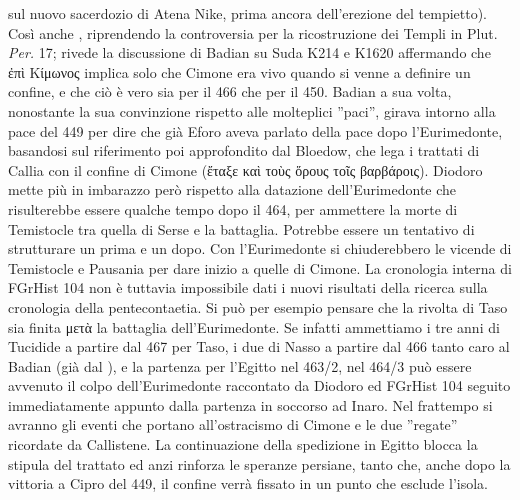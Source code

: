 {            %
\label{ref:dateeurimedonteepacedicallia} sul nuovo sacerdozio di Atena Nike, prima ancora dell'erezione del tempietto). Così anche \cite[143]{Accame1982}, riprendendo la controversia per la ricostruzione dei Templi in Plut. \emph{Per.} 17; \cite[41s]{Bloedow1992} rivede la discussione di Badian su Suda K214 e K1620 affermando che \textgreek{ἐπὶ Kίμωνος}  implica solo che  Cimone era vivo quando si venne a definire un confine, e che ciò è vero sia per il 466 che per il 450. Badian a sua volta, nonostante la sua convinzione rispetto alle molteplici ''paci'', girava intorno alla pace del 449 per dire che già Eforo aveva parlato della pace dopo l'Eurimedonte, basandosi sul riferimento poi approfondito dal Bloedow, che lega i trattati di Callia con il confine di  Cimone (\textgreek{ἔταξε καὶ τοὺς ὅρους τοῖς βαρβάροις}).  Diodoro mette più in imbarazzo però rispetto alla datazione dell'Eurimedonte che risulterebbe essere qualche tempo dopo il 464, per ammettere la morte di Temistocle tra quella di Serse e la battaglia. Potrebbe essere un tentativo di strutturare un prima e un dopo. Con l'Eurimedonte si chiuderebbero le vicende di Temistocle e Pausania  per dare inizio a quelle di Cimone. La cronologia interna di FGrHist 104 non è tuttavia impossibile dati i nuovi risultati della ricerca sulla cronologia della pentecontaetia. Si può per esempio pensare che la rivolta di Taso sia finita \textgreek{μετὰ} la battaglia dell'Eurimedonte. Se infatti ammettiamo i tre anni di Tucidide a partire dal 467 per Taso, i due di Nasso a partire dal 466 tanto caro al Badian (già dal \cite*[7s]{Badian1987}), e la partenza per l'Egitto nel 463/2, nel 464/3 può essere avvenuto il colpo dell'Eurimedonte raccontato da  Diodoro ed FGrHist 104 seguito immediatamente appunto dalla partenza in soccorso ad Inaro. Nel frattempo si avranno gli eventi che portano all'ostracismo di  Cimone e le due ''regate'' ricordate da  Callistene. La continuazione della spedizione in Egitto blocca la stipula del trattato ed anzi rinforza le speranze persiane, tanto che, anche dopo la vittoria a Cipro del 449, il confine verrà fissato in un punto che esclude l'isola. 
}
